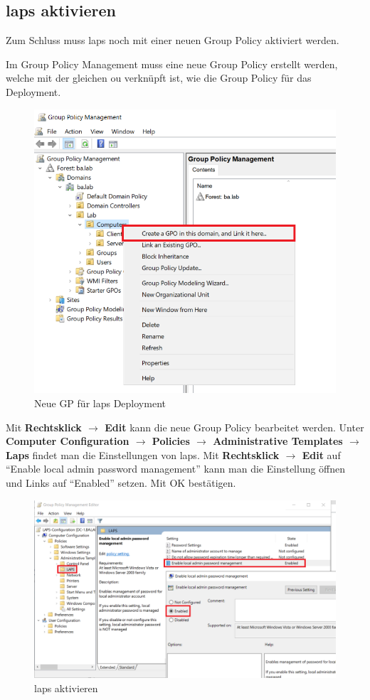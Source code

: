 \subsection{\acrshort{laps} aktivieren}
Zum Schluss muss \acrshort{laps} noch mit einer neuen Group Policy aktiviert werden.

Im Group Policy Management muss eine neue Group Policy erstellt werden, welche mit der gleichen \acrshort{ou} verknüpft ist, wie die Group Policy für das Deployment.
\begin{figure}[H]
    \centering
    \includegraphics[width=0.7\linewidth]{../img/LAPS/GPO-Create-New.png}
    \caption{Neue GP für \acrshort{laps} Deployment}
\end{figure}

Mit \textbf{Rechtsklick $\rightarrow$ Edit} kann die neue Group Policy bearbeitet werden.
Unter \textbf{Computer Configuration $\rightarrow$ Policies $\rightarrow$ Administrative Templates $\rightarrow$ Laps} findet man die Einstellungen von \acrshort{laps}.
Mit \textbf{Rechtsklick $\rightarrow$ Edit} auf ``Enable local admin password management'' kann man die Einstellung öffnen und Links auf ``Enabled'' setzen.
Mit OK bestätigen.
\begin{figure}[H]
    \centering
    \includegraphics[width=0.7\linewidth]{../img/LAPS/enable-laps.png}
    \caption{\acrshort{laps} aktivieren}
\end{figure}

